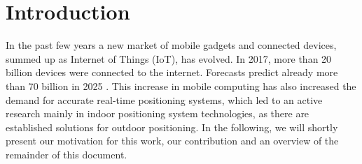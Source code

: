 
\chapter{Introduction} %

\label{Chapter1} %

In the past few years a new market of mobile gadgets and connected devices, summed up as Internet of Things (IoT), has evolved. In 2017, more than 20 billion devices were connected to the internet. Forecasts predict already more than 70 billion in 2025 \cite{Statista}. This increase in mobile computing has also increased the demand for accurate real-time positioning systems, which led to an active research mainly in indoor positioning system technologies, as there are established solutions for outdoor positioning.
In the following, we will shortly present our motivation for this work, our contribution and an overview of the remainder of this document.


